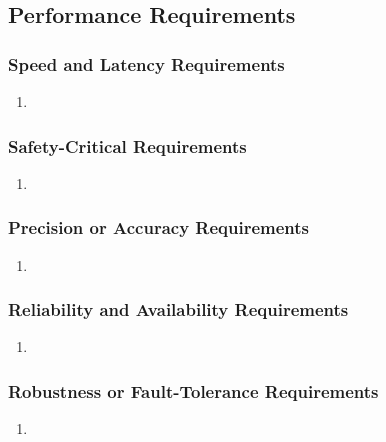 \documentclass[]{article}
\begin{document}

\subsection{Performance Requirements}
\label{sub:performance_requirements}

\subsubsection{Speed and Latency Requirements}
\label{ssub:speed_and_latency_requirements}
\begin{enumerate}[{PR-SL}1. ]
	\item 
\end{enumerate}

\subsubsection{Safety-Critical Requirements}
\label{ssub:safety_critical_requirements}
\begin{enumerate}[{PR-SC}1. ]
	\item 
\end{enumerate}

\subsubsection{Precision or Accuracy Requirements}
\label{ssub:precision_or_accuracy_requirements}
\begin{enumerate}[{PR-PA}1. ]
	\item 
\end{enumerate}

\subsubsection{Reliability and Availability Requirements}
\label{ssub:reliability_and_availability_requirements}
\begin{enumerate}[{PR-RA}1. ]
	\item 
\end{enumerate}

\subsubsection{Robustness or Fault-Tolerance Requirements}
\label{ssub:robustness_or_fault_tolerance_requirements}
\begin{enumerate}[{PR-RFT}1. ]
	\item 
\end{enumerate}
\end{document}
